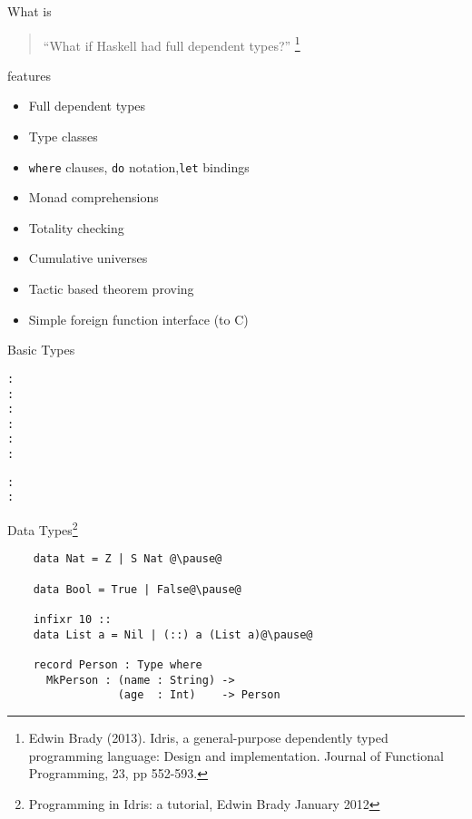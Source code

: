 \documentclass[handout]{beamer}
\title{\idris}
\subtitle{A language with dependent types}
\author{Alejandro Gómez-Londoño}
\date{31th March, 2014}
\institute{EAFIT University}
\begin{document}
\begin{frame}
  \titlepage
\end{frame}

\begin{frame}{What is \idris}
  \begin{quotation}
    “What if Haskell had full dependent types?”
    \footnote[frame,1]{ Edwin Brady (2013). Idris, a general-purpose
      dependently typed programming language: Design and
      implementation. Journal of Functional Programming, 23, pp
      552-593.}
  \end{quotation}
\end{frame}

\begin{frame}{\idris features}
  \begin{itemize}
    \item Full dependent types
    \item Type classes
    \item \texttt{where} clauses, \texttt{do} notation,\texttt{let} bindings
    \item Monad comprehensions
    \item Totality checking
    \item Cumulative universes
    \item Tactic based theorem proving
    \item Simple foreign function interface (to C)
  \end{itemize}
\end{frame}

\begin{frame}[fragile]{\idris}{Basic Types}
\begin{alltt}

  {\color{red}{Z}}     : {\color{blue}{Nat}}
  {\color{red}{50}}    : {\color{blue}{Integer}}
  {\color{red}{1.23}}  : {\color{blue}{Float}}
  {\color{red}{True}}  : {\color{blue}{Bool}}\pause
  {\color{red}{'a'}}   : {\color{blue}{Char}}
  {\color{red}{"foo"}} : {\color{blue}{String}}\pause

  {\color{red}{[1,2,3]}} : {\color{blue}{List Integer}}
  {\color{red}{[1,2,3]}} : {\color{blue}{Vect 3 Integer}}
\end{alltt}
\end{frame}

\begin{frame}[fragile]{\idris}
  {Data Types\footnote[frame,1]
    {Programming in Idris: a tutorial, Edwin Brady January 2012}}
  \begin{lstlisting}
    data Nat = Z | S Nat @\pause@

    data Bool = True | False@\pause@

    infixr 10 ::
    data List a = Nil | (::) a (List a)@\pause@

    record Person : Type where
      MkPerson : (name : String) ->
                 (age  : Int)    -> Person
  \end{lstlisting}
\end{frame}
\end{document}
